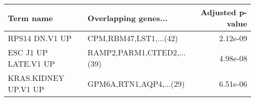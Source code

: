\begin{tabular}{llr}
\toprule
           Term name &       Overlapping genes... &  Adjusted p-value \\
\midrule
      RPS14 DN.V1 UP &     CPM,RBM47,LST1,...(42) &          2.12e-09 \\
ESC J1 UP LATE.V1 UP & RAMP2,PARM1,CITED2,...(39) &          4.98e-08 \\
KRAS.KIDNEY UP.V1 UP &    GPM6A,RTN1,AQP4,...(29) &          6.51e-06 \\
\bottomrule
\end{tabular}
